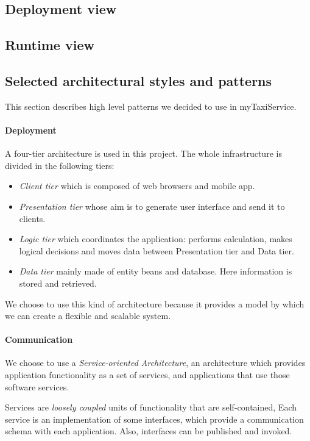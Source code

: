\subsection{Deployment view}
\label{sec:deploy}

\subsection{Runtime view}

\subsection{Selected architectural styles and patterns}
This section describes high level patterns we decided to use in myTaxiService.

\paragraph{Deployment} A four-tier architecture is used in this project.
The whole infrastructure is divided in the following tiers:

\begin{itemize}
    \item{\emph{Client tier} which is composed of web browsers and mobile app.}
    \item{\emph{Presentation tier} whose aim is to generate user interface and send it to clients.}
    \item{\emph{Logic tier} which coordinates the application: performs calculation, makes logical decisions and moves data between Presentation tier and Data tier.}
    \item{\emph{Data tier} mainly made of entity beans and database. 
    Here information is stored and retrieved.}
\end{itemize}

We choose to use this kind of architecture because it provides a model by which
we can create a flexible and scalable system.

\paragraph{Communication} We choose to use a \emph{Service-oriented Architecture}\cite{soa}, 
an architecture which provides application functionality as a set of services, 
and applications that use those software services. 

Services are \emph{loosely coupled} units of functionality that are self-contained, 
Each service is an implementation of some interfaces, which provide a communication schema with
each application. Also, interfaces can be published and invoked.

